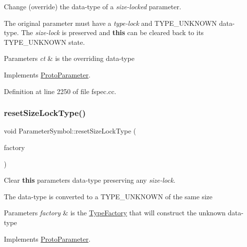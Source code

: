 Change (override) the data-\/type of a {\itshape size-\/locked} parameter. 

The original parameter must have a {\itshape type-\/lock} and T\+Y\+P\+E\+\_\+\+U\+N\+K\+N\+O\+WN data-\/type. The {\itshape size-\/lock} is preserved and {\bfseries{this}} can be cleared back to its T\+Y\+P\+E\+\_\+\+U\+N\+K\+N\+O\+WN state. 
\begin{DoxyParams}{Parameters}
{\em ct} & is the overriding data-\/type \\
\hline
\end{DoxyParams}


Implements \mbox{\hyperlink{class_proto_parameter_a05418aa9f8e8fa0c7499b99cd51e24d3}{Proto\+Parameter}}.



Definition at line 2250 of file fspec.\+cc.

\mbox{\label{class_parameter_symbol_a5cc33796ba27a4f9032fecbc20a65e28}} 
\subsubsection{\texorpdfstring{resetSizeLockType()}{resetSizeLockType()}}
{\footnotesize\ttfamily void Parameter\+Symbol\+::reset\+Size\+Lock\+Type (\begin{DoxyParamCaption}\item[{\mbox{\hyperlink{class_type_factory}{Type\+Factory}} $\ast$}]{factory }\end{DoxyParamCaption})\hspace{0.3cm}{\ttfamily [virtual]}}



Clear {\bfseries{this}} parameter\textquotesingle{}s data-\/type preserving any {\itshape size-\/lock}. 

The data-\/type is converted to a T\+Y\+P\+E\+\_\+\+U\+N\+K\+N\+O\+WN of the same size 
\begin{DoxyParams}{Parameters}
{\em factory} & is the \mbox{\hyperlink{class_type_factory}{Type\+Factory}} that will construct the unknown data-\/type \\
\hline
\end{DoxyParams}


Implements \mbox{\hyperlink{class_proto_parameter_a15d92b3da7ab6b1cd6cf52dea6ee2978}{Proto\+Parameter}}.



